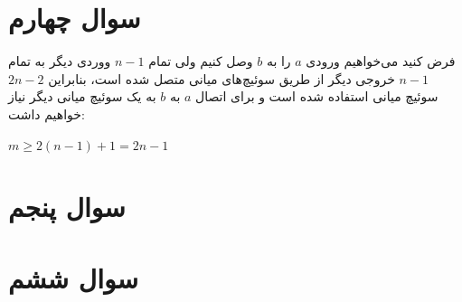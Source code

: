 \documentclass[paper=a4, fontsize=11pt]{article}
\numberwithin{equation}{section} %
\numberwithin{figure}{section} %
\numberwithin{table}{section} %
\begin{document}
\section{سوال چهارم}
فرض کنید می‌خواهیم ورودی $a$ را به $b$
وصل کنیم ولی تمام $n-1$ ووردی دیگر
به تمام $n-1$ خروجی دیگر از طریق سوئیچ‌های میانی متصل شده است،
بنابراین $2n-2$ سوئیچ میانی استفاده شده است و
برای اتصال $a$ به $b$ به یک سوئیچ میانی دیگر نیاز خواهیم داشت:

$m \ge 2(n - 1) + 1 = 2n - 1$

\section{سوال پنجم}

\section{سوال ششم}
\end{document}
